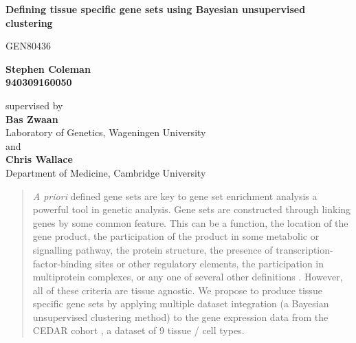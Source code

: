 \documentclass[12pt]{article} %
\begin{document}
 \pgfplotsset{compat=1.15}
	
	\begin{titlepage}
		\begin{center}
			\vspace*{1cm}
			
			\par{\LARGE \textbf{Defining tissue specific gene sets using Bayesian unsupervised clustering}}
			
			\vspace{0.5cm}
			GEN80436
			
			\vspace{1.5cm}
			
			\textbf{Stephen Coleman \\ 940309160050}
			
			\vspace{0.8cm}
			
			supervised by \\
			\textbf{Bas Zwaan} \\
			Laboratory of Genetics, Wageningen University \\
			and \\
			\textbf{Chris Wallace} \\
			Department of Medicine, Cambridge University
			

			
			\vspace{1.0cm}
	
			\begin{abstract}
				\emph{A priori} defined gene sets are key to gene set enrichment analysis \cite{SubramanianGenesetenrichment2005a} a powerful tool in genetic analysis. Gene sets are constructed through linking genes by some common feature. This can be a function, the location of the gene product, the participation of the product in some metabolic or signalling pathway, the protein structure, the presence of transcription-factor-binding sites or other regulatory elements, the participation in multiprotein complexes, or any one of several other definitions \cite{SzklarczykSTRINGv11protein2019}\cite{SubramanianGenesetenrichment2005a}\cite{KanehisaNewapproachunderstanding2019}\cite{AshburnerGeneOntologytool2000a}. However, all of these criteria are tissue agnostic.
				We propose to produce tissue specific gene sets by applying multiple dataset integration \cite{KirkBayesiancorrelatedclustering2012} (a Bayesian unsupervised clustering method) to the gene expression data from the CEDAR cohort \cite{TheInternationalIBDGeneticsConsortiumIBDriskloci2018}, a dataset of 9 tissue / cell types.
			\end{abstract}
		

\end{center}
\end{titlepage}
\end{document}
